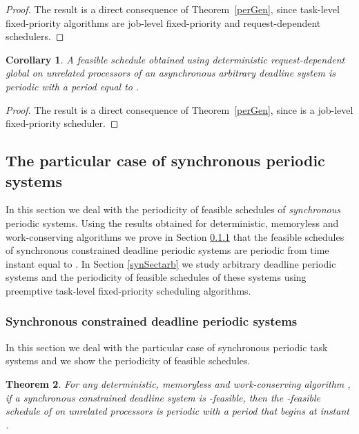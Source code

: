 \documentclass[a4paper,11pt]{article}
\newtheorem{Theorem}{Theorem}
\newtheorem{Corollary}[Theorem]{Corollary}
\begin{document}
\begin{proof}
The result is a direct consequence of Theorem~\ref{perGen}, since task-level fixed-priority algorithms are job-level fixed-priority and request-dependent schedulers.
\end{proof}

\begin{Corollary}\label{edfAll1} A feasible schedule obtained using
  deterministic request-dependent global {} on  unrelated processors of an
  asynchronous arbitrary deadline system  is periodic with a
  period equal to . 
\end{Corollary}

\begin{proof}
  The result is a direct consequence of Theorem~\ref{perGen}, since
  {} is a job-level fixed-priority scheduler.
\end{proof}

\subsection{The particular case of synchronous periodic systems}
\label{SectSynchEns}

In this section we deal with the periodicity of feasible schedules of
\emph{synchronous} periodic systems. Using the results obtained for
deterministic, memoryless and work-conserving algorithms we prove in
Section \ref{synSect} that the feasible schedules of synchronous
constrained deadline periodic systems are periodic from time instant
equal to . In Section \ref{synSectarb} we study arbitrary deadline
periodic systems and the periodicity of feasible schedules of these
systems using preemptive task-level fixed-priority scheduling
algorithms.

\subsubsection{Synchronous constrained deadline periodic
  systems} \label{synSect} 

In this section we deal with the particular case of synchronous
periodic task systems and we show the periodicity of feasible
schedules.

\begin{Theorem}\label{synPer}
  For any deterministic, memoryless and work-conserving  algorithm ,
  if a synchronous constrained deadline system  is -feasible,
  then the -feasible schedule of  on  unrelated processors
  is periodic with a period  that begins at instant .
\end{Theorem}
\end{document}
